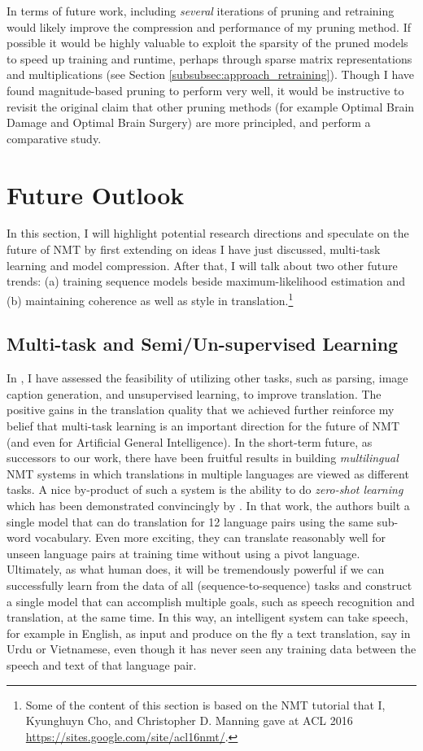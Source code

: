 In terms of future work, including \emph{several} iterations of pruning and retraining would likely improve the compression and performance of my pruning method.
If possible it would be highly valuable to exploit the sparsity of the pruned
models to speed up training and runtime, perhaps through sparse matrix
representations and multiplications (see Section \ref{subsubsec:approach_retraining}).
Though I have found magnitude-based pruning to perform very well, it would be instructive to revisit the original claim that other pruning methods (for example Optimal Brain Damage and Optimal Brain Surgery) are more principled, and perform a comparative study.

\section{Future Outlook}
\label{sec:outlook}
In this section, I will highlight potential research directions and speculate on the future of NMT by first extending on ideas I have just discussed, multi-task learning and model compression. After that, I will talk about two other future trends: (a) training sequence models beside maximum-likelihood estimation and (b) maintaining coherence as well as style in translation.\footnote{Some of the content of this section is based on the NMT tutorial that I, Kyunghuyn Cho, and Christopher D. Manning gave at ACL 2016 \url{https://sites.google.com/site/acl16nmt/}.}

\subsection{Multi-task and Semi/Un-supervised Learning}
In , I have assessed the feasibility of utilizing other tasks, such as parsing, image caption generation, and unsupervised learning, to improve translation. The positive gains in the translation quality that we achieved further reinforce my belief that multi-task learning is an important direction for the future of NMT (and even for Artificial General Intelligence). In the short-term future, as successors to our work, there have been fruitful results in building {\it multilingual} NMT systems \cite{zoph16,firat16,gnmt16multi,ha16} in which translations in multiple languages are viewed as different tasks. A nice by-product of such a system is the ability to do {\it zero-shot learning} which has been demonstrated convincingly by . In that work, the authors built a single model that can do translation for 12 language pairs using the same sub-word vocabulary. Even more exciting, they can translate reasonably well for unseen language pairs at training time without using a pivot language. Ultimately, as what human does, it will be tremendously powerful if we can successfully learn from the data of all (sequence-to-sequence) tasks and construct a single model that can accomplish multiple goals, such as speech recognition and translation, at the same time. In this way, an intelligent system can take speech, for example in English, as input and produce on the fly a text translation, say in Urdu or Vietnamese, even though it has never seen any training data between the speech and text of that language pair.

